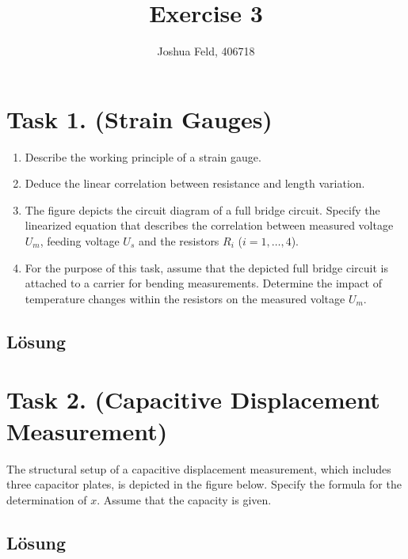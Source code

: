 \documentclass[german,12pt]{homework}
\title{Exercise 3}
\author{Joshua Feld, 406718}
\institute{RWTH Aachen University\\Chair of Process Control Engineering}
\begin{document}
    \maketitle

    \section*{Task 1. (Strain Gauges)}

    \begin{problem}
        \begin{enumerate}
            \item Describe the working principle of a strain gauge.
            \item Deduce the linear correlation between resistance and length
            variation.
            \item The figure depicts the circuit diagram of a full bridge
            circuit. Specify the linearized equation that describes the
            correlation between measured voltage \(U_m\), feeding voltage
            \(U_s\) and the resistors \(R_i\) (\(i = 1, \ldots, 4\)).
            \item For the purpose of this task, assume that the depicted full
            bridge circuit is attached to a carrier for bending measurements.
            Determine the impact of temperature changes within the resistors on
            the measured voltage \(U_m\).
        \end{enumerate}
    \end{problem}

    \subsection*{Lösung}

    \section*{Task 2. (Capacitive Displacement Measurement)}
    \begin{problem}
        The structural setup of a capacitive displacement measurement, which
        includes three capacitor plates, is depicted in the figure below.
        Specify the formula for the determination of \(x\). Assume that the
        capacity is given.
    \end{problem}

    \subsection*{Lösung}
\end{document}

